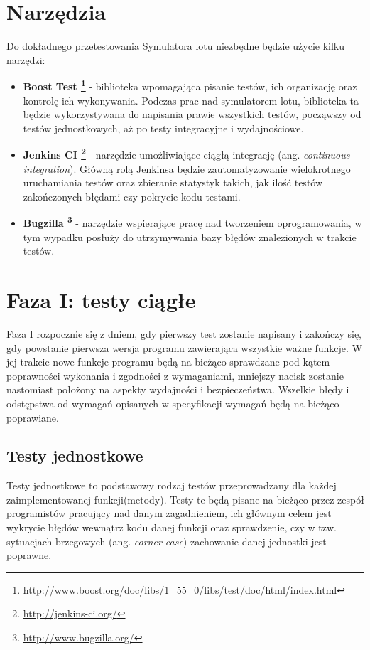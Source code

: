 \documentclass{mwrep}
\begin{document}
\chapter{Narzędzia}
Do dokładnego przetestowania Symulatora lotu niezbędne będzie użycie kilku narzędzi:
\begin{itemize}
\item \textbf{Boost Test \footnote{\url{http://www.boost.org/doc/libs/1\_55\_0/libs/test/doc/html/index.html}}} - biblioteka  wpomagająca pisanie testów, ich organizację oraz kontrolę ich wykonywania. Podczas prac nad symulatorem lotu, biblioteka ta będzie wykorzystywana do napisania prawie wszystkich testów, począwszy od testów jednostkowych, aż po testy integracyjne i wydajnościowe.
\item \textbf{Jenkins CI \footnote{\url{http://jenkins-ci.org/}}} - narzędzie umożliwiające ciągłą integrację (ang. \textit{continuous integration}). Główną rolą Jenkinsa będzie zautomatyzowanie wielokrotnego uruchamiania testów oraz zbieranie statystyk takich, jak ilość testów zakończonych błędami czy pokrycie kodu testami.
\item \textbf{Bugzilla \footnote{\url{http://www.bugzilla.org/}}} - narzędzie wspierające pracę nad tworzeniem oprogramowania, w tym wypadku posłuży do utrzymywania bazy błędów znalezionych w trakcie testów.
\end{itemize}

\chapter{Faza I: testy ciągłe}
Faza I rozpocznie się z dniem, gdy pierwszy test zostanie napisany i zakończy się, gdy powstanie pierwsza wersja programu zawierająca wszystkie ważne funkcje. W jej trakcie nowe funkcje programu będą na bieżąco sprawdzane pod kątem poprawności wykonania i zgodności z wymaganiami, mniejszy nacisk zostanie nastomiast położony na aspekty wydajności i bezpieczeństwa. Wszelkie błędy i odstępstwa od wymagań opisanych w specyfikacji wymagań będą na bieżąco poprawiane.

\section{Testy jednostkowe}
Testy jednostkowe to podstawowy rodzaj testów przeprowadzany dla każdej zaimplementowanej funkcji(metody). Testy te będą pisane na bieżąco przez zespół programistów pracujący nad danym zagadnieniem, ich głównym celem jest wykrycie błędów wewnątrz kodu danej funkcji oraz sprawdzenie, czy w tzw. sytuacjach brzegowych (ang. \textit{corner case}) zachowanie danej jednostki jest poprawne.
\end{document}
